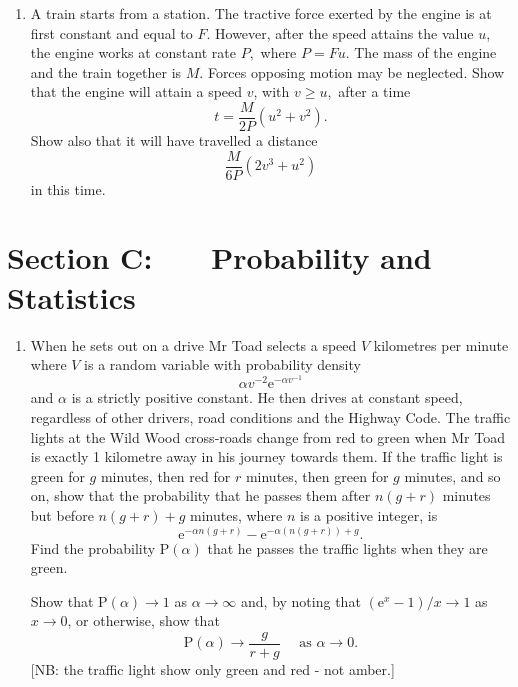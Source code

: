 \documentclass[a4, 11pt]{report}
\newlength{\qspace}
\newcounter{qnumber}
\newenvironment{question}%
 {\vspace{\qspace}
  \begin{enumerate}[\bfseries 1\quad][10]%
    \setcounter{enumi}{\value{qnumber}}%
    \item%
 }
{
  \end{enumerate}
  \filbreak
  \stepcounter{qnumber}
 }
\begin{document}

\begin{question}
A train starts from a station. The tractive force exerted by the engine
is at first constant and equal to $F$. However, after the speed attains
the value $u$, the engine works at constant rate $P,$ where $P=Fu.$
The mass of the engine and the train together is $M.$ Forces opposing
motion may be neglected. Show that the engine will attain a speed
$v$, with $v\geqslant u,$ after a time 
\[
t=\frac{M}{2P}\left(u^{2}+v^{2}\right).
\]
Show also that it will have travelled a distance 
\[
\frac{M}{6P}(2v^{3}+u^{2})
\]
in this time. 




\end{question}
	

	
	\newpage
\section*{Section C: \ \ \ Probability and Statistics}

\begin{question}
When he sets out on a drive Mr Toad selects a speed $V$ kilometres
per minute where $V$ is a random variable with probability density
\[
\alpha v^{-2}\mathrm{e}^{-\alpha v^{-1}}
\]
 and $\alpha$ is a strictly
positive constant. He then drives at constant speed, regardless of
other drivers, road conditions and the Highway Code. The traffic lights
at the Wild Wood cross-roads change from red to green when Mr Toad
is exactly 1 kilometre away in his journey towards them. If the traffic
light is green for $g$ minutes, then red for $r$ minutes, then green
for $g$ minutes, and so on, show that the probability that he passes
them after $n(g+r)$ minutes but before $n(g+r)+g$ minutes, where
$n$ is a positive integer, is 
\[
\mathrm{e}^{-\alpha n(g+r)}-\mathrm{e}^{-\alpha\left(n(g+r)\right)+g}.
\]
Find the probability $\mathrm{P}(\alpha)$ that he passes the traffic
lights when they are green. 


Show that $\mathrm{P}(\alpha)\rightarrow1$ as $\alpha\rightarrow\infty$
and, by noting that $(\mathrm{e}^{x}-1)/x\rightarrow1$ as $x\rightarrow0$,
or otherwise, show that 
\[
\mathrm{P}(\alpha)\rightarrow\frac{g}{r+g}\quad\mbox{ as }\alpha\rightarrow0.
\]
{[}NB: the traffic light show only green and red - not amber.{]} 
\end{question}
\end{document}
